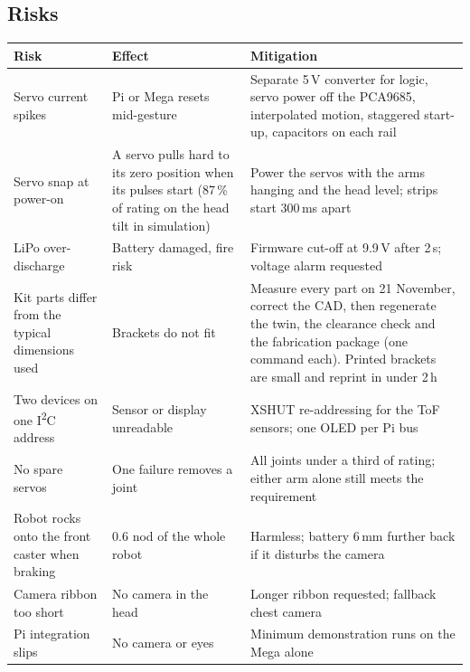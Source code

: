 \documentclass[11pt,a4paper]{article}
\renewcommand{\deg}{\textdegree}
\begin{document}
\subsection{Risks}
\begin{table}[H]\small
\begin{tabularx}{\linewidth}{@{}P{40mm}P{38mm}L@{}}
\toprule
\textbf{Risk} & \textbf{Effect} & \textbf{Mitigation}\\
\midrule
Servo current spikes & Pi or Mega resets mid-gesture & Separate 5\,V converter for logic, servo power off the PCA9685, interpolated motion, staggered start-up, capacitors on each rail\\
Servo snap at power-on & A servo pulls hard to its zero position when its pulses start (87\,\% of rating on the head tilt in simulation) & Power the servos with the arms hanging and the head level; strips start 300\,ms apart\\
LiPo over-discharge & Battery damaged, fire risk & Firmware cut-off at 9.9\,V after 2\,s; voltage alarm requested\\
Kit parts differ from the typical dimensions used & Brackets do not fit & Measure every part on 21 November, correct the CAD, then regenerate the twin, the clearance check and the fabrication package (one command each). Printed brackets are small and reprint in under 2\,h\\
Two devices on one I\textsuperscript{2}C address & Sensor or display unreadable & XSHUT re-addressing for the ToF sensors; one OLED per Pi bus\\
No spare servos & One failure removes a joint & All joints under a third of rating; either arm alone still meets the requirement\\
Robot rocks onto the front caster when braking & 0.6\deg{} nod of the whole robot & Harmless; battery 6\,mm further back if it disturbs the camera\\
Camera ribbon too short & No camera in the head & Longer ribbon requested; fallback chest camera\\
Pi integration slips & No camera or eyes & Minimum demonstration runs on the Mega alone\\
\bottomrule
\end{tabularx}
\end{table}
\end{document}
